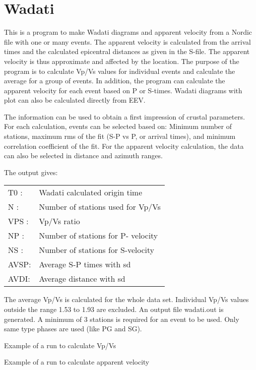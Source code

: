 
\section{Wadati} 

This is a program to make Wadati diagrams and apparent velocity from a Nordic file with one or many events. The apparent velocity is calculated from the arrival times and the calculated epicentral distances as given in the S-file. The apparent velocity is thus approximate and affected by the location. \newline
The purpose of the program is to calculate Vp/Vs values for individual events and calculate the average for a group of events. In addition, the program can calculate the apparent velocity for each event based on P or S-times. Wadati diagrams with plot can also be calculated directly from EEV. 

The information can be used to obtain a first impression of crustal parameters. 
For each calculation, events can be selected based on: Minimum number of stations, maximum rms of the fit (S-P vs P, or arrival times), and minimum correlation coefficient of the fit. For the apparent velocity calculation, the data can also be selected in distance and azimuth ranges. 

The output gives: 

\begin{tabular}{lp{10cm}}
T0 : & Wadati calculated origin time \\
N : & Number of stations used for Vp/Vs \\
VPS : & Vp/Vs ratio \\
NP : & Number of stations for P- velocity \\
NS : & Number of stations for S-velocity \\
AVSP: & Average S-P times with sd \\
AVDI: & Average distance with sd \\
\end{tabular}

The average Vp/Vs is calculated for the whole data set. Individual Vp/Vs values outside the range 
1.53 to 1.93 are excluded. An output file wadati.out is generated. A minimum of 3 stations is required for an event to be used. Only same type phases are used (like PG and SG).  

Example of a run to calculate Vp/Vs 



Example of a run to calculate apparent velocity



